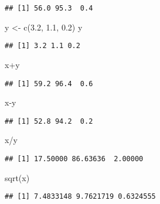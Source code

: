 \documentclass[
]{article}
\newenvironment{Shaded}{\begin{snugshade}}{\end{snugshade}}
\newcommand{\FloatTok}[1]{\textcolor[rgb]{0.00,0.00,0.81}{#1}}
\newcommand{\FunctionTok}[1]{\textcolor[rgb]{0.00,0.00,0.00}{#1}}
\newcommand{\NormalTok}[1]{#1}
\newcommand{\OtherTok}[1]{\textcolor[rgb]{0.56,0.35,0.01}{#1}}
\newcommand{\SpecialCharTok}[1]{\textcolor[rgb]{0.00,0.00,0.00}{#1}}
\begin{document}
\begin{verbatim}
## [1] 56.0 95.3  0.4
\end{verbatim}

\begin{Shaded}
\begin{Highlighting}[]
\NormalTok{y }\OtherTok{\textless{}{-}} \FunctionTok{c}\NormalTok{(}\FloatTok{3.2}\NormalTok{, }\FloatTok{1.1}\NormalTok{, }\FloatTok{0.2}\NormalTok{)}
\NormalTok{y}
\end{Highlighting}
\end{Shaded}

\begin{verbatim}
## [1] 3.2 1.1 0.2
\end{verbatim}

\begin{Shaded}
\begin{Highlighting}[]
\NormalTok{x}\SpecialCharTok{+}\NormalTok{y}
\end{Highlighting}
\end{Shaded}

\begin{verbatim}
## [1] 59.2 96.4  0.6
\end{verbatim}

\begin{Shaded}
\begin{Highlighting}[]
\NormalTok{x}\SpecialCharTok{{-}}\NormalTok{y}
\end{Highlighting}
\end{Shaded}

\begin{verbatim}
## [1] 52.8 94.2  0.2
\end{verbatim}

\begin{Shaded}
\begin{Highlighting}[]
\NormalTok{x}\SpecialCharTok{/}\NormalTok{y}
\end{Highlighting}
\end{Shaded}

\begin{verbatim}
## [1] 17.50000 86.63636  2.00000
\end{verbatim}

\begin{Shaded}
\begin{Highlighting}[]
\FunctionTok{sqrt}\NormalTok{(x)}
\end{Highlighting}
\end{Shaded}

\begin{verbatim}
## [1] 7.4833148 9.7621719 0.6324555
\end{verbatim}
\end{document}
